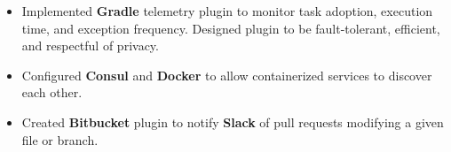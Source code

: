 \begin{itemize}[leftmargin=*]
    \item {
        Implemented \textbf{Gradle} telemetry plugin to monitor task adoption, execution time, and exception frequency. Designed plugin to be fault-tolerant, efficient, and respectful of privacy.
    }
    \item {
        Configured \textbf{Consul} and \textbf{Docker} to allow containerized services to discover each other.
    }
    \item {
        Created \textbf{Bitbucket} plugin to notify \textbf{Slack} of pull requests modifying a given file or branch.
    }
\end{itemize}
